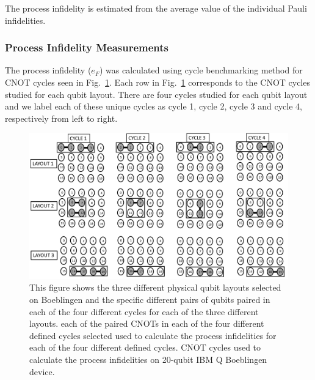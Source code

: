 The process infidelity is estimated from the average value of the individual Pauli infidelities.


\subsubsection{Process Infidelity Measurements}
The process infidelity ($e_{F}$) was calculated using cycle benchmarking method for CNOT cycles seen in Fig.~\ref{fig:BoeblingenCycles}. Each row in Fig.~\ref{fig:BoeblingenCycles} corresponds to the CNOT cycles  studied for each qubit layout. There are four cycles studied for each qubit layout and we label each of these unique cycles as cycle 1, cycle 2, cycle 3 and cycle 4, respectively from left to right.

\begin{figure}[ht!]
    \includegraphics[scale=0.5]{Cycle-Layout.pdf}
    \caption{This figure shows the three different physical qubit layouts selected on Boeblingen and the specific different pairs of qubits paired in each of the four different cycles for each of the three different layouts.  each of the paired CNOTs in each of the four different defined cycles selected  used to calculate the process infidelities for each of the four different defined cycles. CNOT cycles used to calculate the process infidelities on 20-qubit IBM Q Boeblingen device.}
   \label{fig:BoeblingenCycles}
\end{figure}






